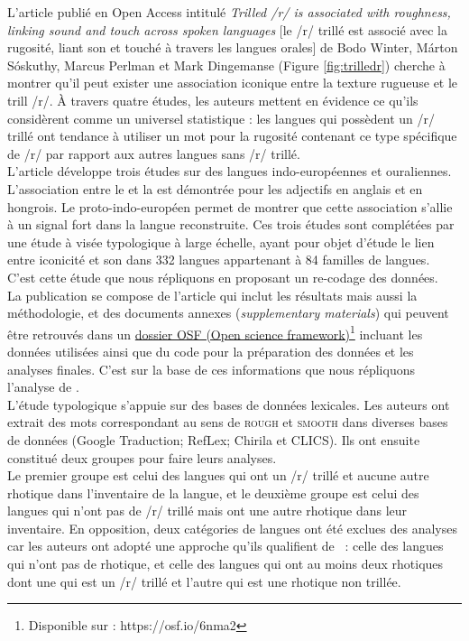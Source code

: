 L’article publié en Open Access intitulé \textit{Trilled /r/ is associated with roughness, linking sound and touch across spoken languages} [le /r/ trillé est associé avec la rugosité, liant son et touché à travers les langues orales] de Bodo Winter, Márton Sóskuthy, Marcus Perlman et Mark Dingemanse  \parencite*{winterTrilledAssociatedRoughness2022} (Figure \ref{fig:trilledr}) cherche à montrer qu’il peut exister une association iconique entre la texture rugueuse et le trill /r/.
À travers quatre études, les auteurs mettent en évidence ce qu’ils considèrent comme un universel statistique : les langues qui possèdent un /r/ trillé ont tendance à utiliser un mot pour la rugosité contenant ce type spécifique de /r/ par rapport aux autres langues sans /r/ trillé.\\

L'article développe trois études sur des langues indo-européennes et ouraliennes. L'association entre le  et la  est démontrée pour les adjectifs en anglais et en hongrois. Le proto-indo-européen permet de montrer que cette association s'allie à un signal fort dans la langue reconstruite. Ces trois études sont complétées par une étude à visée typologique à large échelle, ayant pour objet d'étude le lien entre iconicité et son dans 332 langues appartenant à 84 familles de langues. C'est cette étude que nous répliquons en proposant un re-codage des données.\\

La publication se compose de l’article qui inclut les résultats mais aussi la méthodologie, et des documents annexes (\textit{supplementary materials}) qui peuvent être retrouvés dans un \href{https://osf.io/6nma2/}{dossier OSF (Open science framework)\footnote{Disponible sur : \url{https://osf.io/6nma2}}} incluant les données utilisées ainsi que du code pour la préparation des données et les analyses finales. C'est sur la base de ces informations que nous répliquons l'analyse de \textcite{winterTrilledAssociatedRoughness2022}.\\

L'étude typologique s'appuie sur des bases de données lexicales. Les auteurs ont extrait des mots correspondant au sens de \textsc{rough} et \textsc{smooth} dans diverses bases de données (Google Traduction; RefLex; Chirila et CLICS). Ils ont ensuite constitué deux groupes pour faire leurs analyses.\\

Le premier groupe est celui des langues qui ont un /r/ trillé et aucune autre rhotique dans l’inventaire de la langue, et le deuxième groupe est celui des langues qui n’ont pas de /r/ trillé mais ont une autre rhotique dans leur inventaire.
En opposition, deux catégories de langues ont été exclues des analyses car les auteurs ont adopté une approche qu’ils qualifient de  : celle des langues qui n’ont pas de rhotique, et celle des langues qui ont au moins deux rhotiques dont une qui est un /r/ trillé et l’autre qui est une rhotique non trillée.\\


